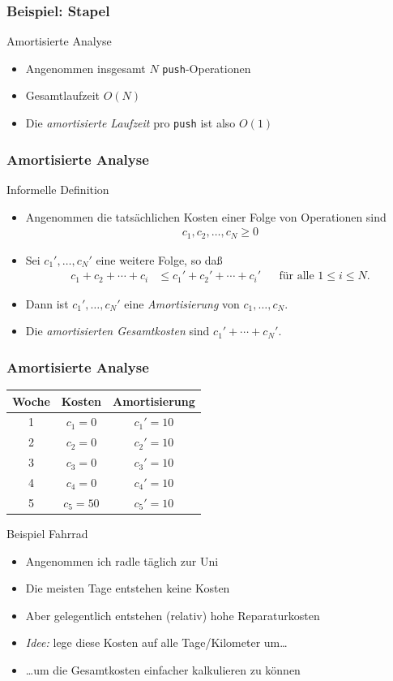 \documentclass[aspectratio=1610, 11pt]{beamer}
\begin{document}
\begin{frame}\frametitle{Beispiel: Stapel}
	\begin{exampleblock}{Amortisierte Analyse}
		\begin{itemize}
			\item Angenommen insgesamt $N$ {\tt push}-Operationen
			\item Gesamtlaufzeit $O(N)$
			\item Die \emph{amortisierte Laufzeit} pro {\tt push} ist also $O(1)$
		\end{itemize}
	\end{exampleblock}
\end{frame}

\begin{frame}\frametitle{Amortisierte Analyse}
	\begin{exampleblock}{Informelle Definition}
		\begin{itemize}
			\item Angenommen die tats\"achlichen Kosten einer Folge von Operationen sind
				\begin{align*}
					c_1,c_2,\ldots,c_N\geq0
				\end{align*}
			\item Sei $c_1',\ldots,c_N'$ eine weitere Folge, so da\ss
				\begin{align*}
					c_1+c_2+\cdots+c_i&\leq c_1'+c_2'+\cdots+c_i'&&\mbox{f\"ur alle }1\leq i\leq N.
				\end{align*}
			\item Dann ist $c_1',\ldots,c_N'$ eine \emph{Amortisierung} von $c_1,\ldots,c_N$.
			\item Die \emph{amortisierten Gesamtkosten} sind $c_1'+\cdots+c_N'$.
		\end{itemize}
	\end{exampleblock}
\end{frame}

\begin{frame}\frametitle{Amortisierte Analyse}
	\hfill
	{\begin{tabular}{c|c|c}
			Woche&Kosten&Amortisierung\\\hline
			1&$c_1=0$&$c_1'=10$\\
			2&$c_2=0$&$c_2'=10$\\
			3&$c_3=0$&$c_3'=10$\\
			4&$c_4=0$&$c_4'=10$\\
			5&$c_5=50$&$c_5'=10$
	\end{tabular}}
	\begin{exampleblock}{Beispiel Fahrrad}
		\begin{itemize}
			\item Angenommen ich radle t\"aglich zur Uni
			\item Die meisten Tage entstehen keine Kosten 
			\item Aber gelegentlich entstehen (relativ) hohe Reparaturkosten
			\item \emph{Idee:} lege diese Kosten auf alle Tage/Kilometer um\dots
			\item \dots um die Gesamtkosten einfacher kalkulieren zu k\"onnen 
		\end{itemize}
	\end{exampleblock}
\end{frame}
\end{document}
